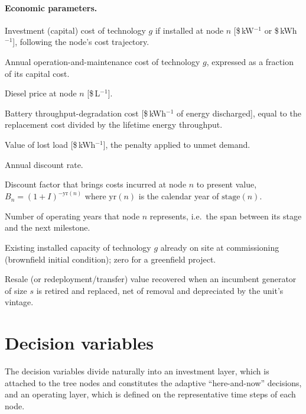 \documentclass[11pt,a4paper]{article}
\theoremstyle{plain}
\theoremstyle{definition}
\begin{document}
\paragraph{Economic parameters.}
\begin{description}[leftmargin=3.0cm,style=nextline]
  \item[$C^{\mathrm{inv}}_{g,n}$] Investment (capital) cost of technology $g$ if
  installed at node $n$ [\$\,kW$^{-1}$ or \$\,kWh$^{-1}$], following the node's cost
  trajectory.
  \item[$O_{g}$] Annual operation-and-maintenance cost of technology $g$, expressed as a
  fraction of its capital cost.
  \item[$C^{\mathrm{fuel}}_n$] Diesel price at node $n$ [\$\,L$^{-1}$].
  \item[$C^{\mathrm{deg}}$] Battery throughput-degradation cost [\$\,kWh$^{-1}$ of energy
  discharged], equal to the replacement cost divided by the lifetime energy throughput.
  \item[$V^{\mathrm{lol}}$] Value of lost load [\$\,kWh$^{-1}$], the penalty applied to unmet demand.
  \item[$I$] Annual discount rate.
  \item[$B_n$] Discount factor that brings costs incurred at node $n$ to present
  value, $B_n=(1+I)^{-\mathrm{yr}(n)}$ where $\mathrm{yr}(n)$ is the calendar year of $\mathrm{stage}(n)$.
  \item[$\Delta_n$] Number of operating years that node $n$ represents, i.e.\ the span
  between its stage and the next milestone.
  \item[$C^{g}_0$] Existing installed capacity of technology $g$ already on site at
  commissioning (brownfield initial condition); zero for a greenfield project. 
  \item[$V^{\mathrm{ge}}_s$] Resale (or redeployment/transfer) value recovered when an
  incumbent generator of size $s$ is retired and replaced, net of removal and depreciated
  by the unit's vintage.
\end{description}

\section{Decision variables}
\label{sec:variables}

The decision variables divide naturally into an investment layer, which is attached to
the tree nodes and constitutes the adaptive ``here-and-now'' decisions, and an operating
layer, which is defined on the representative time steps of each node.
\end{document}
